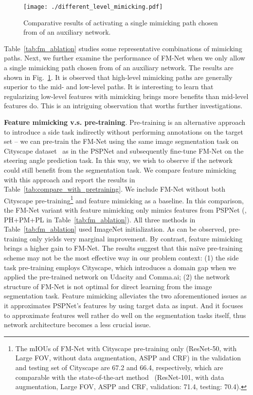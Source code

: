 \begin{figure}[t]
  \centering
  \texttt{[image: ./different\_level\_mimicking.pdf]}
  \vskip -0.3cm
  \caption{Comparative results of activating a single mimicking path chosen from  of an auxiliary network.}
\label{fig:different_level_mimicking}
\end{figure}

Table~\ref{tab:fm_ablation} studies some representative combinations of mimicking paths. Next, we further examine the performance of FM-Net when we only allow a single mimicking path chosen from  of an auxiliary network. The results are shown in Fig.~\ref{fig:different_level_mimicking}.
It is observed that high-level mimicking paths are generally superior to the mid- and low-level paths. It is interesting to learn that regularizing low-level features with mimicking brings more benefits than mid-level features do. This is an intriguing observation that worths further investigations.




\vspace{0.15cm}
\noindent\textbf{Feature mimicking v.s. pre-training}.
Pre-training is an alternative approach to introduce a side task indirectly without performing annotations on the target set -- we can pre-train the FM-Net using the same image segmentation task on Cityscape dataset~\cite{cordts2016cityscapes} as in the PSPNet and subsequently fine-tune FM-Net on the steering angle prediction task. In this way, we wish to observe if the network could still benefit from the segmentation task.
We compare feature mimicking with this approach and report the results in Table~\ref{tab:compare_with_pretraining}. We include FM-Net without both Cityscape pre-training\footnote{The mIOUs of FM-Net with Cityscape pre-training only (ResNet-50, with Large FOV, without data augmentation, ASPP and CRF) in the validation and testing set of Cityscape are 67.2 and 66.4, respectively, which are comparable with the state-of-the-art method~\cite{chen2018deeplab} (ResNet-101, with data augmentation, Large FOV, ASPP and CRF, validation: 71.4, testing: 70.4).} and feature mimicking as a baseline. In this comparison, the FM-Net variant with feature mimicking only mimics features from PSPNet (\ie, PH+PM+PL in Table~\ref{tab:fm_ablation}). All three methods in Table~\ref{tab:fm_ablation} used ImageNet initialization.
As can be observed, pre-training only yields very marginal improvement. By contrast, feature mimicking brings a higher gain to FM-Net. The results suggest that this na\"{i}ve pre-training scheme may not be the most effective way in our problem context: (1) the side task pre-training employs Cityscape, which introduces a domain gap when we applied the pre-trained network on Udacity and Comma.ai; (2) the network structure of FM-Net is not optimal for direct learning from the image segmentation task.
Feature mimicking alleviates the two aforementioned issues as it approximates PSPNet's features by using target data as input. And it focuses to approximate  features well rather do well on the segmentation tasks itself, thus network architecture becomes a less crucial issue.


